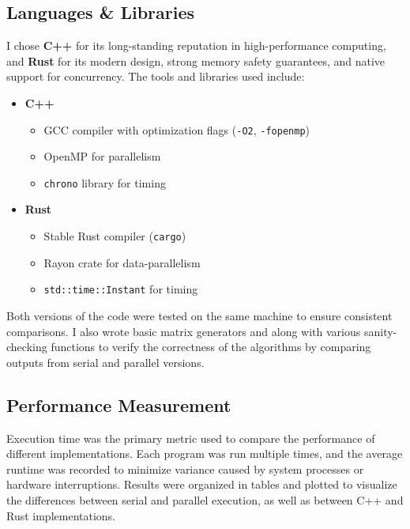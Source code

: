 \documentclass[12pt]{article}
\begin{document}
\subsection*{Languages \& Libraries}

I chose \textbf{C++} for its long-standing reputation in high-performance computing, and \textbf{Rust} for its modern design, strong memory safety guarantees,
and native support for concurrency. The tools and libraries used include:

\begin{itemize}
    \item \textbf{C++}
          \begin{itemize}
              \item GCC compiler with optimization flags (\texttt{-O2}, \texttt{-fopenmp})
              \item OpenMP for parallelism
              \item \texttt{chrono} library for timing
          \end{itemize}

    \item \textbf{Rust}
          \begin{itemize}
              \item Stable Rust compiler (\texttt{cargo})
              \item Rayon crate for data-parallelism
              \item \texttt{std::time::Instant} for timing
          \end{itemize}
\end{itemize}

Both versions of the code were tested on the same machine to ensure consistent comparisons. I also wrote basic matrix generators and along with various
sanity-checking functions to verify the correctness of the algorithms by comparing outputs from serial and parallel versions.

\subsection*{Performance Measurement}

Execution time was the primary metric used to compare the performance of different implementations. Each program was run multiple times, and the average
runtime was recorded to minimize variance caused by system processes or hardware interruptions. Results were organized in tables and plotted to visualize
the differences between serial and parallel execution, as well as between C++ and Rust implementations.
\end{document}
